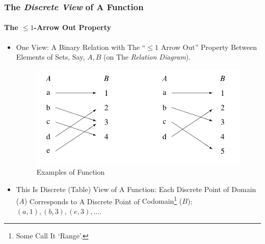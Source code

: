 \begin{frame}
\frametitle{The \textit{Discrete View} of A Function} 
\framesubtitle{The $\leq 1$-Arrow Out Property}
\label{slide:discrete-function-view-1}
\begin{itemize}
\item One View: A \alert{Binary Relation} with The \alert{``$\leq1$ Arrow Out''} Property Between Elements of Sets, Say, $A,B$ (on The \textit{Relation Diagram}).
{
\begin{figure}[H]
\centering
\includegraphics[width=.6\textwidth]{images/function-ex}
\caption{Examples of Function}
\label{fig:functionex}
\end{figure}
}
\item<3-> This Is \alert{Discrete (Table) View of A Function}: Each Discrete Point of \alert{Domain ($A$)} Corresponds to A Discrete Point of \alert{Codomain\footnote{Some Call It `Range'.} ($B$)}:$(a,1),(b,3),(e,3),\dots$.
\end{itemize}
\end{frame}

